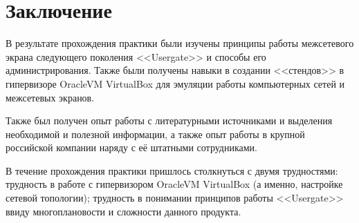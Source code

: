 \section{Заключение}
	\begin{justify}
		\newPar{}В результате прохождения практики были изучены принципы работы межсетевого экрана следующего поколения <<Usergate>> и способы его администрирования. Также были получены навыки в создании <<стендов>> в гипервизоре OracleVM VirtualBox для эмуляции работы компьютерных сетей и межсетевых экранов.
		
		Также был получен опыт работы с литературными источниками и выделения необходимой и полезной информации, а также опыт работы в крупной российской компании наряду с её штатными сотрудниками.
		
		В течение прохождения практики пришлось столкнуться с двумя трудностями: трудность в работе с гипервизором OracleVM VirtualBox (а именно, настройке сетевой топологии); трудность в понимании принципов работы <<Usergate>> ввиду многоплановости и сложности данного продукта.
	\end{justify}
\printbibliography[heading=bibintoc, title={Список литературы}]

